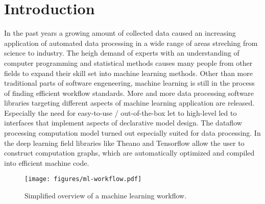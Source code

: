 \documentclass[english]{article}
\begin{document}
\section{Introduction}
In the past years a growing amount of collected data caused an increasing application of automated data processing in a wide range of areas streching from  science to industry.
The heigh demand of experts with an understanding of computer programming and statistical methods causes many people from other fields to expand their skill set into machine learning methods. Other than more traditional parts of software engeneering, machine learning is still in the process of finding efficient workflow standards. More and more data processing software libraries targeting different aspects of machine learning application are released. Especially the need for easy-to-use / out-of-the-box let to high-level led to interfaces that implement aspects of declarative model design. The dataflow processing computation model turned out especially suited for data processing. In the deep learning field libraries like Theano and Tensorflow allow the user to construct computation graphs, which are automatically optimized and compiled into efficient machine code.

\begin{figure}[h]
  \centering
  \texttt{[image: figures/ml-workflow.pdf]}
  \caption{Simplified overview of a machine learning workflow.}
  \label{ml-workflow}
\end{figure}
\end{document}
